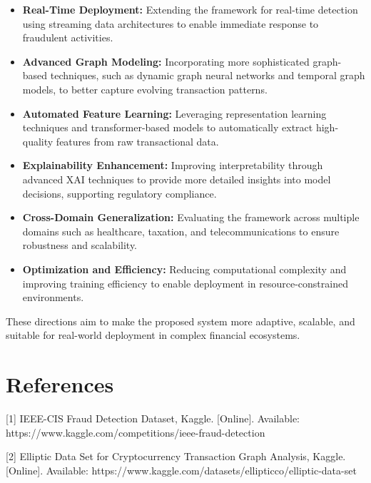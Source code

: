 \documentclass[conference]{IEEEtran}
\begin{document}
\begin{itemize}
    \item \textbf{Real-Time Deployment:}  
    Extending the framework for real-time detection using streaming data architectures to enable immediate response to fraudulent activities.

    \item \textbf{Advanced Graph Modeling:}  
    Incorporating more sophisticated graph-based techniques, such as dynamic graph neural networks and temporal graph models, to better capture evolving transaction patterns.

    \item \textbf{Automated Feature Learning:}  
    Leveraging representation learning techniques and transformer-based models to automatically extract high-quality features from raw transactional data.

    \item \textbf{Explainability Enhancement:}  
    Improving interpretability through advanced XAI techniques to provide more detailed insights into model decisions, supporting regulatory compliance.

    \item \textbf{Cross-Domain Generalization:}  
    Evaluating the framework across multiple domains such as healthcare, taxation, and telecommunications to ensure robustness and scalability.

    \item \textbf{Optimization and Efficiency:}  
    Reducing computational complexity and improving training efficiency to enable deployment in resource-constrained environments.

\end{itemize}

These directions aim to make the proposed system more adaptive, scalable, and suitable for real-world deployment in complex financial ecosystems.

\section{References}

[1] IEEE-CIS Fraud Detection Dataset, Kaggle. [Online]. Available: https://www.kaggle.com/competitions/ieee-fraud-detection

[2] Elliptic Data Set for Cryptocurrency Transaction Graph Analysis, Kaggle. [Online]. Available: https://www.kaggle.com/datasets/ellipticco/elliptic-data-set
\end{document}
